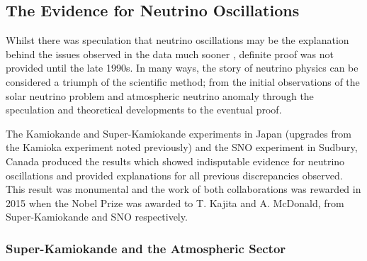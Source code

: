 \subsection{The Evidence for Neutrino Oscillations}\label{sec:EvidenceNeutrinoOscillations}

Whilst there was speculation that neutrino oscillations may be the explanation behind the issues observed in the data much sooner \cite{Casper1991,BeckerSzendy1992}, definite proof was not provided until the late 1990s.  In many ways, the story of neutrino physics can be considered a triumph of the scientific method; from the initial observations of the solar neutrino problem and atmospheric neutrino anomaly through the speculation and theoretical developments to the eventual proof.

The Kamiokande and Super-Kamiokande experiments in Japan (upgrades from the Kamioka experiment noted previously) and the SNO experiment in Sudbury, Canada produced the results which showed indisputable evidence for neutrino oscillations and provided explanations for all previous discrepancies observed.  This result was monumental and the work of both collaborations was rewarded in 2015 when the Nobel Prize was awarded to T. Kajita and A. McDonald, from Super-Kamiokande and SNO respectively.

\subsubsection{Super-Kamiokande and the Atmospheric Sector}\label{sec:SuperKamiokande}


